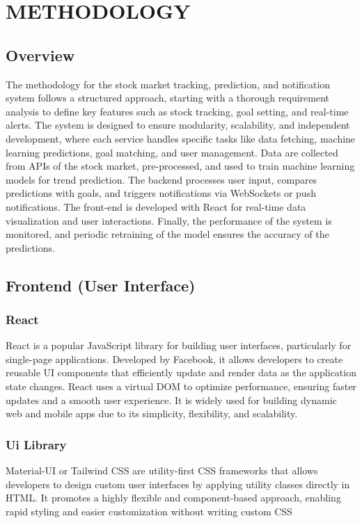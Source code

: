 \chapter{METHODOLOGY}
\section{Overview}

The methodology for the stock market tracking, prediction, and notification system follows a structured approach, starting with a thorough requirement analysis to define key features such as stock tracking, goal setting, and real-time alerts. The system is designed to ensure modularity, scalability, and independent development, where each service handles specific tasks like data fetching, machine learning predictions, goal matching, and user management. Data are collected from APIs of the stock market, pre-processed, and used to train machine learning models for trend prediction. The backend processes user input, compares predictions with goals, and triggers notifications via WebSockets or push notifications. The front-end is developed with React for real-time data visualization and user interactions.  Finally, the performance of the system is monitored, and periodic retraining of the model ensures the accuracy of the predictions.
\section{Frontend (User Interface)}

\subsection{React}
React is a popular JavaScript library for building user interfaces, particularly for single-page applications. Developed by Facebook, it allows developers to create reusable UI components that efficiently update and render data as the application state changes. React uses a virtual DOM to optimize performance, ensuring faster updates and a smooth user experience. It is widely used for building dynamic web and mobile apps due to its simplicity, flexibility, and scalability.

\subsection{Ui Library}Material-UI or Tailwind CSS are utility-first CSS frameworks that allows developers to design custom user interfaces by applying utility classes directly in HTML. It promotes a highly flexible and component-based approach, enabling rapid styling and easier customization without writing custom CSS

